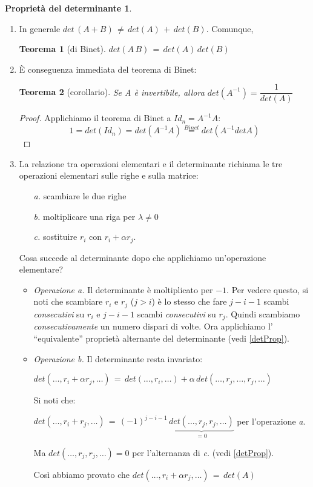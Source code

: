 \documentclass[a4paper]{report}
\newtheorem{teoremaDet}{Teorema}[section]
\theoremstyle{remark}
\theoremstyle{definition}
\newtheorem{detProp}{Proprietà del determinante}
\begin{document}
\begin{detProp}
\begin{enumerate}
\begin{proof}
				${\stackrel{per\,ipotesi\,induttiva}{=}}\,a_{11}\,(a_{22}\dots a_{nn})$
				
			\end{proof}
		\item In generale $det\,(A+B)\,\ne\,det(A)\,+\,det(B)$. Comunque, 
			\begin{teoremaDet}[di Binet]
				$det(A\,B)\,=\,det(A)\,det(B)$
			\end{teoremaDet}
		\item È conseguenza immediata del teorema di Binet:
			\begin{teoremaDet}[corollario]
				Se A è invertibile, allora $det(A^{-1})=\dfrac{1}{det(A)}$
			\end{teoremaDet}
			\begin{proof}
				Applichiamo il teorema di Binet a $Id_{n} = A^{-1}A:$
				\[
				1=det(Id_{n})=det(A^{-1}A){\stackrel{Binet}{=}}det(A^{-1}detA)
				\]
			\end{proof}
		\item La relazione tra operazioni elementari e il determinante richiama le tre operazioni elementari sulle righe e 	sulla matrice:
			\begin{enumerate}
				\item [{\itshape a.}] scambiare le due righe
				\item [{\itshape b.}] moltiplicare una riga per $\lambda\ne0$
				\item [{\itshape c.}] sostituire $r_{i}$ con $r_{i}+\alpha r_{j}$.
			\end{enumerate}
			Cosa succede al determinante dopo che applichiamo un'operazione elementare?
			\begin{itemize}
				\item {\itshape Operazione a.} Il determinante è moltiplicato per $-1$. Per vedere questo, si noti che scambiare $r_{i}$ e $r_{j}$ ($j>i$) è lo stesso che fare $j-i-1$ scambi {\em consecutivi} su $r_{i}$ e $j-i-1$ scambi {\em consecutivi} su $r_{j}$. Quindi scambiamo {\em consecutivamente} un numero dispari di volte. Ora applichiamo l' ``equivalente'' proprietà alternante del determinante (vedi \ref{detProp}).
				\item {\itshape Operazione b.} Il determinante resta invariato:
				
				$det(\dots,r_{i}+\alpha r_{j},\dots)\,=\,det(\dots,r_i,\dots)+\alpha\,det(\dots,r_j,\dots,r_j,\dots)$
				
				Si noti che:
				
				$det(\dots,r_{i}+ r_{j},\dots)\,=\,(-1)^{j-i-1}\,\underbrace{det(\dots,r_j,r_j,\dots)}_{=0}$ per l'operazione {\itshape a}. 
				
				Ma $det(\dots,r_j,r_j,\dots)=0$ per l'alternanza di {\itshape c.} (vedi \ref{detProp}).
				
				Così abbiamo provato che $det(\dots,r_{i}+\alpha r_{j},\dots)\,=\,det(A)$
			\end{itemize}
	\end{enumerate}
\end{detProp}
%
\end{document}
